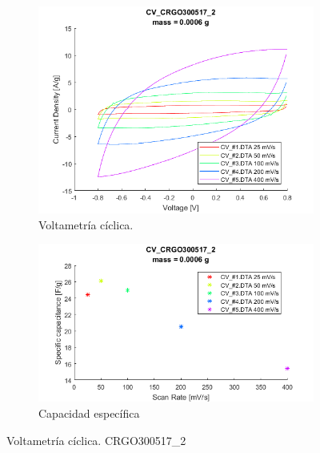 \begin{figure}
	{
		\begin{subfigure}{0.6\textwidth}
			\includegraphics[width=\textwidth]{./Data/CV_CRGO300517_2.png}
			\caption{Voltametría cíclica.}
		\end{subfigure}
		\begin{subfigure}{0.6\textwidth}
			\includegraphics[width=\textwidth]{./Data/SC_CRGO300517_2.png}
			\caption{Capacidad específica}
		\end{subfigure}
	}
	\caption{Voltametría cíclica. CRGO300517\_2}
	\label{fig:CV_CRGO300517_2}
\end{figure}


